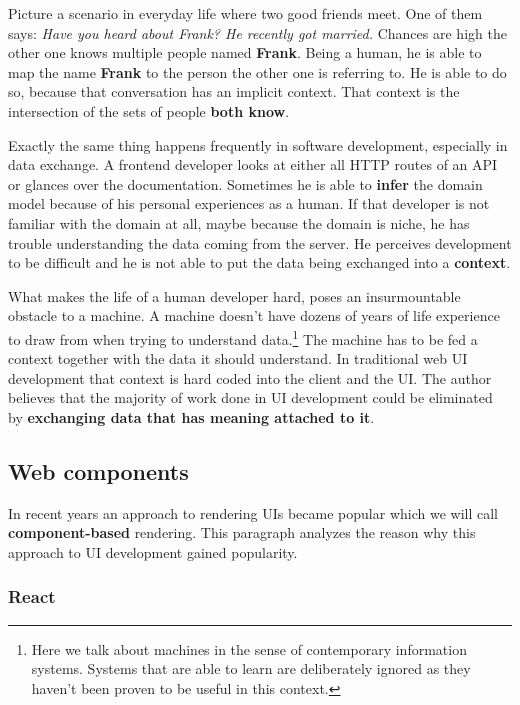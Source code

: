 Picture a scenario in everyday life where two good friends meet. One of them says: \textit{Have you heard about Frank? He recently got married.} Chances are high the other one knows multiple people named \textbf{Frank}. Being a human, he is able to map the name \textbf{Frank} to the person the other one is referring to. He is able to do so, because that conversation has an implicit context. That context is the intersection of the sets of people \textbf{both know}.
\par Exactly the same thing happens frequently in software development, especially in data exchange. A frontend developer looks at either all HTTP routes of an API or glances over the documentation. Sometimes he is able to \textbf{infer} the domain model because of his personal experiences as a human. If that developer is not familiar with the domain at all, maybe because the domain is niche, he has trouble understanding the data coming from the server. He perceives development to be difficult and he is not able to put the data being exchanged into a \textbf{context}.
\par What makes the life of a human developer hard, poses an insurmountable obstacle to a machine. A machine doesn't have dozens of years of life experience to draw from when trying to understand data.\footnote{Here we talk about machines in the sense of contemporary information systems. Systems that are able to learn are deliberately ignored as they haven't been proven to be useful in this context.} The machine has to be fed a context together with the data it should understand. In traditional web UI development that context is hard coded into the client and the UI. The author believes that the majority of work done in UI development could be eliminated by \textbf{exchanging data that has meaning attached to it}.

\subsection{Web components}\label{webcomponents}

In recent years an approach to rendering UIs became popular which we will call \textbf{component-based} rendering. This paragraph analyzes the reason why this approach to UI development gained popularity.

\subsubsection{React}

